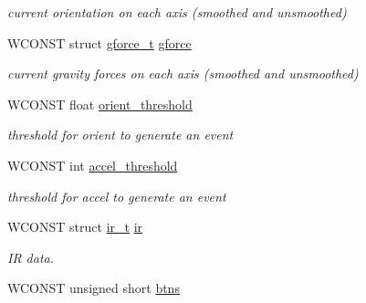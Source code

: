 \begin{DoxyCompactItemize}
\begin{DoxyCompactList}\small\item\em current orientation on each axis (smoothed and unsmoothed) \end{DoxyCompactList}\item 
\hypertarget{structwiimote__t_ab2ccaf1bd030bfb24aa60c474b34d1f4}{\-W\-C\-O\-N\-S\-T struct \hyperlink{structgforce__t}{gforce\-\_\-t} \hyperlink{structwiimote__t_ab2ccaf1bd030bfb24aa60c474b34d1f4}{gforce}}\label{structwiimote__t_ab2ccaf1bd030bfb24aa60c474b34d1f4}

\begin{DoxyCompactList}\small\item\em current gravity forces on each axis (smoothed and unsmoothed) \end{DoxyCompactList}\item 
\hypertarget{structwiimote__t_ab8e07b8b47e89082b89396d10100db9a}{\-W\-C\-O\-N\-S\-T float \hyperlink{structwiimote__t_ab8e07b8b47e89082b89396d10100db9a}{orient\-\_\-threshold}}\label{structwiimote__t_ab8e07b8b47e89082b89396d10100db9a}

\begin{DoxyCompactList}\small\item\em threshold for orient to generate an event \end{DoxyCompactList}\item 
\hypertarget{structwiimote__t_a078b9e0aeeacfdabad482db1214d0a88}{\-W\-C\-O\-N\-S\-T int \hyperlink{structwiimote__t_a078b9e0aeeacfdabad482db1214d0a88}{accel\-\_\-threshold}}\label{structwiimote__t_a078b9e0aeeacfdabad482db1214d0a88}

\begin{DoxyCompactList}\small\item\em threshold for accel to generate an event \end{DoxyCompactList}\item 
\hypertarget{structwiimote__t_a1435415306dac952f29a70d4c3ff206c}{\-W\-C\-O\-N\-S\-T struct \hyperlink{structir__t}{ir\-\_\-t} \hyperlink{structwiimote__t_a1435415306dac952f29a70d4c3ff206c}{ir}}\label{structwiimote__t_a1435415306dac952f29a70d4c3ff206c}

\begin{DoxyCompactList}\small\item\em \-I\-R data. \end{DoxyCompactList}\item 
\hypertarget{structwiimote__t_a2e9cbb4da318589efc65ceadc62aca6c}{\-W\-C\-O\-N\-S\-T unsigned short \hyperlink{structwiimote__t_a2e9cbb4da318589efc65ceadc62aca6c}{btns}}\label{structwiimote__t_a2e9cbb4da318589efc65ceadc62aca6c}


\end{DoxyCompactItemize}
